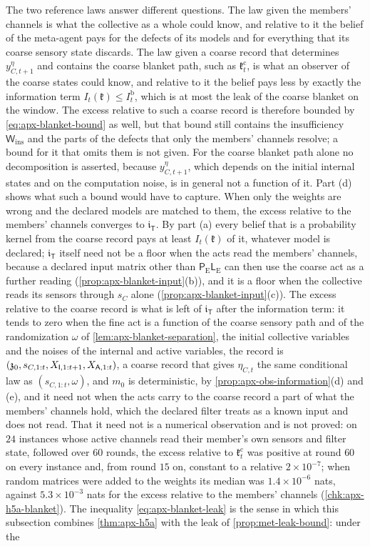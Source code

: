 The two reference laws answer different questions. The law given the members' channels is what the collective as a whole could know, and relative to it the belief of the meta-agent pays for the defects of its models and for everything that its coarse sensory state discards. The law given a coarse record that determines $y^\eta_{C,t+1}$ and contains the coarse blanket path, such as $\mathfrak k^{\mathrm c}_t$, is what an observer of the coarse states could know, and relative to it the belief pays less by exactly the information term $I_t(\mathfrak k)\le I^{\mathrm b}_t$, which is at most the leak of the coarse blanket on the window. The excess relative to such a coarse record is therefore bounded by \eqref{eq:apx-blanket-bound} as well, but that bound still contains the insufficiency $\mathsf W_{\mathrm{ins}}$ and the parts of the defects that only the members' channels resolve; a bound for it that omits them is not given. For the coarse blanket path alone no decomposition is asserted, because $y^\eta_{C,t+1}$, which depends on the initial internal states and on the computation noise, is in general not a function of it. Part (d) shows what such a bound would have to capture. When only the weights are wrong and the declared models are matched to them, the excess relative to the members' channels converges to $\mathfrak i_{\mathsf T}$. By part (a) every belief that is a probability kernel from the coarse record pays at least $I_t(\mathfrak k)$ of it, whatever model is declared; $\mathfrak i_{\mathsf T}$ itself need not be a floor when the acts read the members' channels, because a declared input matrix other than $\mathsf P_{\mathrm E}\mathsf L_{\mathrm E}$ can then use the coarse act as a further reading (\cref{prop:apx-blanket-input}(b)), and it is a floor when the collective reads its sensors through $s_C$ alone (\cref{prop:apx-blanket-input}(c)). The excess relative to the coarse record is what is left of $\mathfrak i_{\mathsf T}$ after the information term: it tends to zero when the fine act is a function of the coarse sensory path and of the randomization $\omega$ of \cref{lem:apx-blanket-separation}, the initial collective variables and the noises of the internal and active variables, the record is $(\mathfrak z_0,s_{C,1:t},X_{\mathsf{I},1:t+1},X_{\mathsf{A},1:t})$, a coarse record that gives $\eta_{C,t}$ the same conditional law as $(s_{C,1:t},\omega)$, and $m_0$ is deterministic, by \cref{prop:apx-obs-information}(d) and (e), and it need not when the acts carry to the coarse record a part of what the members' channels hold, which the declared filter treats as a known input and does not read. That it need not is a numerical observation and is not proved: on $24$ instances whose active channels read their member's own sensors and filter state, followed over $60$ rounds, the excess relative to $\mathfrak k^{\mathrm c}_t$ was positive at round $60$ on every instance and, from round $15$ on, constant to a relative $2\times10^{-7}$; when random matrices were added to the weights its median was $1.4\times10^{-6}$ nats, against $5.3\times10^{-3}$ nats for the excess relative to the members' channels (\cref{chk:apx-h5a-blanket}). The inequality \eqref{eq:apx-blanket-leak} is the sense in which this subsection combines \cref{thm:apx-h5a} with the leak of \cref{prop:met-leak-bound}: under the 